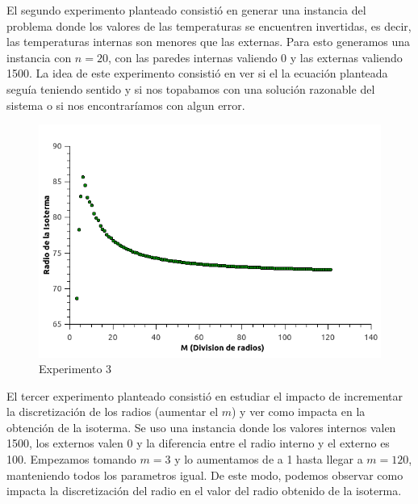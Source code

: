 El segundo experimento planteado consistió en generar una instancia del problema donde los valores de las temperaturas se encuentren invertidas, es decir, las temperaturas internas son menores que las externas. Para esto generamos una instancia con $n=20$, con las paredes internas valiendo 0 y las externas valiendo 1500. La idea de este experimento consistió en ver si el la ecuación planteada seguía teniendo sentido y si nos topabamos con una solución razonable del sistema o si nos encontraríamos con algun error.
\\
\begin{figure}
  \vspace{-20pt}
  \begin{center}
    \includegraphics[scale= 0.4]{imagenes/graphDiscretizacionv2.png}
  \end{center}
  \vspace{-20pt}
  \caption{Experimento 3}
  \vspace{-10pt}
  \label{fig:Exp3}
\end{figure}

El tercer experimento planteado consistió en estudiar el impacto de incrementar la discretización de los radios (aumentar el $m$) y ver como impacta en la obtención de la isoterma. Se uso una instancia donde los valores internos valen 1500, los externos valen 0 y la diferencia entre el radio interno y el externo es 100. Empezamos tomando $m=3$ y lo aumentamos de a 1 hasta llegar a $m=120$, manteniendo todos los parametros igual. De este modo, podemos observar como impacta la discretización del radio en el valor del radio obtenido de la isoterma.\\
